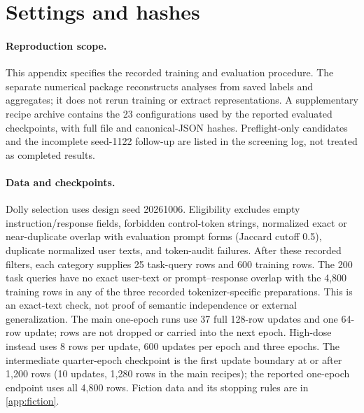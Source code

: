 \documentclass{article}
\begin{document}
\FloatBarrier
\section{Settings and hashes}
\label{app:hashes}

\paragraph{Reproduction scope.} This appendix specifies the recorded training
and evaluation procedure. The separate numerical package reconstructs analyses
from saved labels and aggregates; it does not rerun training or extract
representations. A supplementary recipe archive contains the 23 configurations
used by the reported evaluated checkpoints, with full file and canonical-JSON
hashes. Preflight-only candidates and the incomplete seed-1122 follow-up are
listed in the screening log, not treated as completed results.

\paragraph{Data and checkpoints.} Dolly selection uses design seed 20261006.
Eligibility excludes empty instruction/response fields, forbidden control-token
strings, normalized exact or near-duplicate overlap with evaluation prompt forms
(Jaccard cutoff 0.5), duplicate normalized user texts, and token-audit failures.
After these recorded filters, each category supplies
25 task-query rows and 600 training rows. The 200 task queries have no exact
user-text or prompt--response overlap with the 4,800 training rows in any of
the three recorded tokenizer-specific preparations. This is an exact-text
check, not proof of semantic independence or external generalization.
The main one-epoch runs use 37 full 128-row updates and one 64-row update;
rows are not dropped or carried into the next epoch. High-dose instead uses
8 rows per update, 600 updates per epoch and three epochs. The intermediate
quarter-epoch checkpoint is the first update boundary at or after 1,200 rows
(10 updates, 1,280 rows in the main recipes); the reported one-epoch endpoint
uses all 4,800 rows. Fiction data and its stopping rules are in
\cref{app:fiction}.
\end{document}
